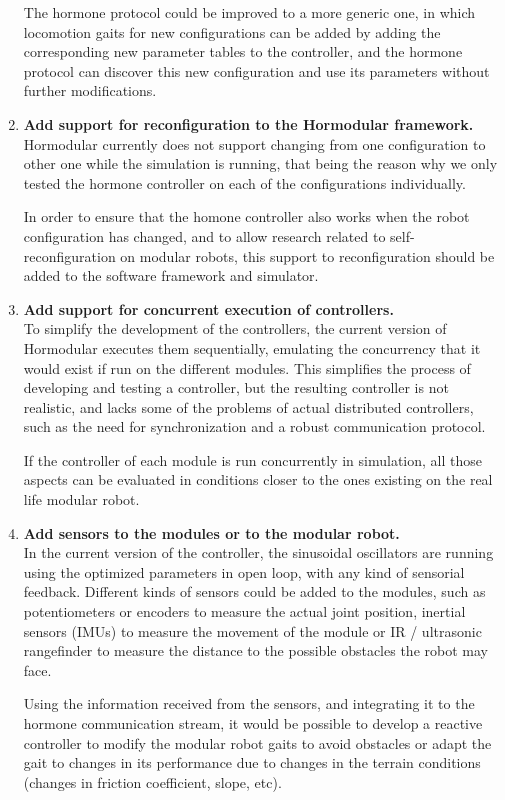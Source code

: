 \begin{enumerate}
	The hormone protocol could be improved to a more generic one, in which locomotion gaits for new configurations can be added by adding the corresponding new parameter tables to the controller, and the hormone protocol can discover this new configuration and use its parameters without further modifications.\\
	
	\item \textbf{Add support for reconfiguration to the Hormodular framework.}\\ Hormodular currently does not support changing from one configuration to other one while the simulation is running, that being the reason why we only tested the hormone controller on each of the configurations individually.
	
	 In order to ensure that the homone controller also works when the robot configuration has changed, and to allow research related to self-reconfiguration on modular robots, this support to reconfiguration should be added to the software framework and simulator.\\
	
	\item \textbf{Add support for concurrent execution of controllers.}\\ To simplify the development of the controllers, the current version of Hormodular executes them sequentially, emulating the concurrency that it would exist if run on the different modules. This simplifies the process of developing and testing a controller, but the resulting controller is not realistic, and lacks some of the problems of actual distributed controllers, such as the need for synchronization and a robust communication protocol.
	
	If the controller of each module is run concurrently in simulation, all those aspects can be evaluated in conditions closer to the ones existing on the real life modular robot. \\
	
	\item \textbf{Add sensors to the modules or to the modular robot.}\\ In the current version of the controller, the sinusoidal oscillators are running using the optimized parameters in open loop, with any kind of sensorial feedback. Different kinds of sensors could be added to the modules, such as potentiometers or encoders to measure the actual joint position, inertial sensors (IMUs) to measure the movement of the module or IR / ultrasonic rangefinder to measure the distance to the possible obstacles the robot may face.
	
	 Using the information received from the sensors, and integrating it to the hormone communication stream, it would be possible to develop a reactive controller to modify the modular robot gaits to avoid obstacles or adapt the gait to changes in its performance due to changes in the terrain conditions (changes in friction coefficient, slope, etc).\\
\end{enumerate}